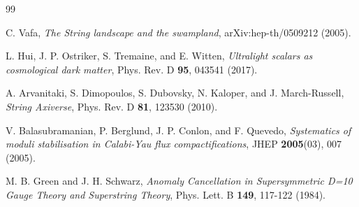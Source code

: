 \documentclass[aps,prd,twocolumn,nofootinbib,superscriptaddress,10pt]{revtex4-2}
\begin{document}

\begin{thebibliography}{99}

C. Vafa, 
\textit{The String landscape and the swampland},
arXiv:hep-th/0509212 (2005).

L. Hui, J. P. Ostriker, S. Tremaine, and E. Witten,
\textit{Ultralight scalars as cosmological dark matter},
Phys. Rev. D \textbf{95}, 043541 (2017).

A. Arvanitaki, S. Dimopoulos, S. Dubovsky, N. Kaloper, and J. March-Russell,
\textit{String Axiverse},
Phys. Rev. D \textbf{81}, 123530 (2010).

V. Balasubramanian, P. Berglund, J. P. Conlon, and F. Quevedo,
\textit{Systematics of moduli stabilisation in Calabi-Yau flux compactifications},
JHEP \textbf{2005}(03), 007 (2005).

M. B. Green and J. H. Schwarz,
\textit{Anomaly Cancellation in Supersymmetric D=10 Gauge Theory and Superstring Theory},
Phys. Lett. B \textbf{149}, 117-122 (1984).

\end{thebibliography}
\end{document}
